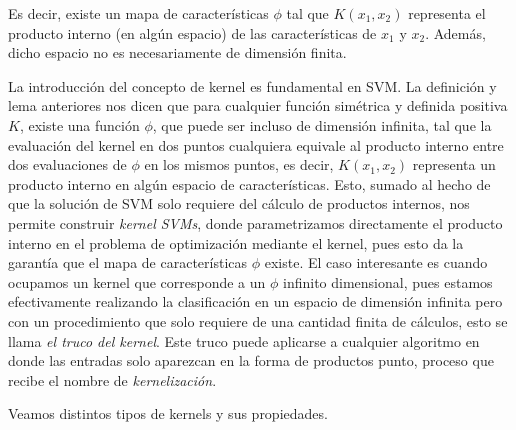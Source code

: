 Es decir, existe un mapa de características $\phi$ tal que $K(x_1, x_2)$ representa el producto interno (en algún espacio) de las características de $x_1$ y $x_2$. Además, dicho espacio no es necesariamente de dimensión finita.

\begin{remark}
La introducción del concepto de kernel es fundamental en SVM. La definición y lema anteriores nos dicen que para cualquier función simétrica y definida positiva $K$, existe una función $\phi$, que puede ser incluso de dimensión infinita, tal que la evaluación del kernel en dos puntos cualquiera equivale al producto interno entre dos evaluaciones de $\phi$ en los mismos puntos, es decir, $K(x_1,x_2)$ representa un producto interno en algún espacio de características. Esto, sumado al hecho de que la solución de SVM solo requiere del cálculo de productos internos, nos permite construir \emph{kernel SVMs}, donde parametrizamos directamente el producto interno en el problema de optimización mediante el kernel, pues esto da la garantía que el mapa de características $\phi$ existe. El caso interesante es cuando ocupamos un kernel que corresponde a un $\phi$ infinito dimensional, pues estamos efectivamente realizando la clasificación en un espacio de dimensión infinita pero con un procedimiento que solo requiere de una cantidad finita de cálculos, esto se llama \emph{el truco del kernel}. Este truco puede aplicarse a cualquier algoritmo en donde las entradas solo aparezcan en la forma de productos punto, proceso que recibe el nombre de \emph{kernelización}. 
\end{remark}

\newpage

 Veamos distintos tipos de kernels y sus propiedades.

